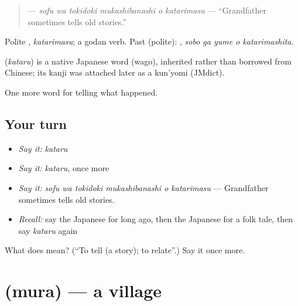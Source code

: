 \begin{quote}
\textbf{   } — \emph{sofu wa tokidoki mukashibanashi o katarimasu} — \textquotedblleft{}Grandfather sometimes tells old stories.\textquotedblright{}
\end{quote}

Polite \textbf{}, \emph{katarimasu}; a godan verb. Past (polite): \textbf{  }, \emph{sobo ga yume o katarimashita}.

\begin{cousinweb}
\textbf{} (\emph{kataru}) is a native Japanese word (wago), inherited rather than borrowed from Chinese; its kanji was attached later as a kun'yomi (JMdict).
\end{cousinweb}

\begin{grammarlens}[title={What you've built}]
One more word for telling what happened.
\end{grammarlens}

\subsection*{Your turn}
\begin{itemize}
\raggedright
  \item \emph{Say it:} \emph{kataru}
  \item \emph{Say it:} \emph{kataru}, once more
  \item \emph{Say it:} \emph{sofu wa tokidoki mukashibanashi o katarimasu} — Grandfather sometimes tells old stories.
  \item \emph{Recall:} say the Japanese for long ago, then the Japanese for a folk tale, then say \emph{kataru} again
\end{itemize}

\begin{tcolorbox}[breakable,colback=teal!4,colframe=teal!35!black,title={Before you move on}]
What does  mean? (\textquotedblleft{}To tell (a story); to relate\textquotedblright{}.) Say it once more.
\end{tcolorbox}
\section[\texorpdfstring{\ja{むら} (mura)}{むら (mura)}]{ (mura) — a village}

\label{lesson:JA-C298-mura}



